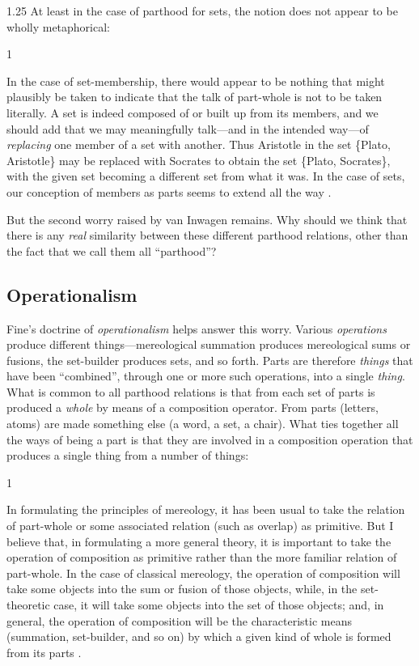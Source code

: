 \documentclass[12pt,twoside]{reedfancy}
\newenvironment{squote}{%
	\begin{spacing}{1}
	\begin{list}{}{%
	\setlength{\labelwidth}{0pt}%
	\rightmargin\leftmargin%
	}
	\item\relax
	}{%
	\end{list}%
	\end{spacing}
	}
\begin{document}
\begin{spacing}{1.25}
At least in the case of parthood for sets, the notion does not appear
to be wholly metaphorical:

\begin{squote}
In the case of set-membership, there would appear to be nothing that
might plausibly be taken to indicate that the talk of part-whole is
not to be taken literally. A set is indeed composed of or built up
from its members, and we should add that we may meaningfully
talk---and in the intended way---of \emph{replacing} one member of a
set with another.  Thus Aristotle in the set \{Plato, Aristotle\} may
be replaced with Socrates to obtain the set \{Plato, Socrates\}, with
the given set becoming a different set from what it was. In the case
of sets, our conception of members as parts seems to extend all the
way \citep[564]{fine2010}.
\end{squote}

But the second worry raised by van Inwagen remains.  Why should we
think that there is any {\em real} similarity between these different
parthood relations, other than the fact that we call them all
``parthood''?

\subsection{Operationalism}
\label{operation}
Fine's doctrine of {\em operationalism} helps answer this worry.
Various {\em operations} produce different things---mereological
summation produces mereological sums or fusions, the set-builder
produces sets, and so forth.  Parts are therefore {\em things} that
have been ``combined'', through one or more such operations, into a
single {\em thing}.  What is common to all parthood relations is that
from each set of parts is produced a {\em whole} by means of a
composition operator.  From parts (letters, atoms) are made something
else (a word, a set, a chair).  What ties together all the ways of
being a part is that they are involved in a composition operation that
produces a single thing from a number of things:

\begin{squote}
In formulating the principles of mereology, it has been usual to take
the relation of part-whole or some associated relation (such as
overlap) as primitive.  But I believe that, in formulating a more
general theory, it is important to take the operation of composition
as primitive rather than the more familiar relation of part-whole.  In
the case of classical mereology, the operation of composition will
take some objects into the sum or fusion of those objects, while, in
the set-theoretic case, it will take some objects into the set of
those objects; and, in general, the operation of composition will be
the characteristic means (summation, set-builder, and so on) by which
a given kind of whole is formed from its parts \citep[565]{fine2010}.
\end{squote}


\end{spacing}
\end{document}
